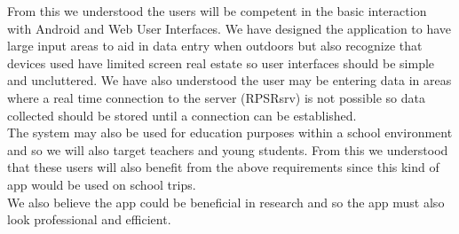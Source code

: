 	From this we understood the users will be competent in the basic interaction with Android and Web User Interfaces. We have designed the application to have large input areas to aid in data entry when outdoors but also recognize that devices used have limited screen real estate so user interfaces should be simple and uncluttered. We have also understood the user may be entering data in areas where a real time connection to the server (RPSRsrv) is not possible so data collected should be stored until a connection can be established.\\

	The system may also be used for education purposes within a school environment and so we will also target teachers and young students. From this we understood that these users will also benefit from the above requirements since this kind of app would be used on school trips.\\
	
	We also believe the app could be beneficial in research and so the app must also look professional and efficient. \\
